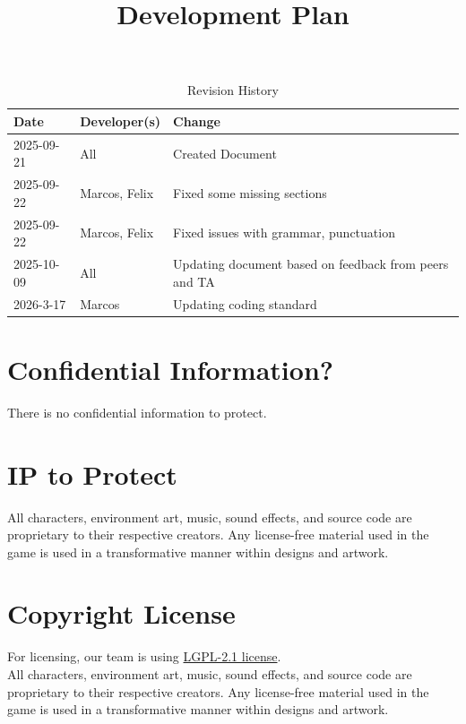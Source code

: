 \documentclass{article}
\title{Development Plan\\\progname}
\author{\authname}
\date{}
\begin{document}
\maketitle

\begin{table}[hp]
\caption{Revision History} \label{TblRevisionHistory}
\begin{tabularx}{\textwidth}{llX}
\toprule
\textbf{Date} & \textbf{Developer(s)} & \textbf{Change}\\
\midrule
2025-09-21 & All & Created Document\\
2025-09-22 & Marcos, Felix & Fixed some missing sections\\
2025-09-22 & Marcos, Felix & Fixed issues with grammar, punctuation\\
2025-10-09 & All & Updating document based on feedback from peers and TA\\
2026-3-17 & Marcos & Updating coding standard\\
\bottomrule
\end{tabularx}
\end{table}

\newpage{}

\tableofcontents

\section{Confidential Information?}

There is no confidential information to protect.

\section{IP to Protect}

All characters, environment art, music, sound effects, and source code are proprietary to their respective creators. Any license-free material used in the game is used in a transformative manner within designs and artwork.\\

\section{Copyright License}

For licensing, our team is using \href{https://github.com/felix-hurst/Ad-Natura/blob/main/LICENSE}{LGPL-2.1 license}.\\

All characters, environment art, music, sound effects, and source code are proprietary to their respective creators. Any license-free material used in the game is used in a transformative manner within designs and artwork.\\
\end{document}
